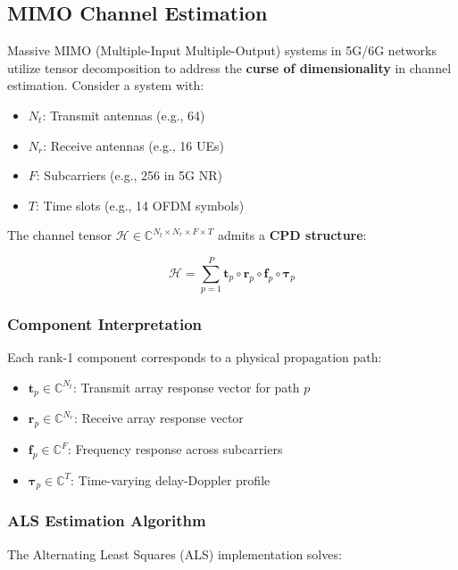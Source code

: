 \documentclass[11pt]{article}
\newcommand\0{\mathbf{0}}
\newcommand\<{\langle}
\renewcommand\>{\rangle}
\begin{document}
    \subsection{MIMO Channel Estimation}
    \label{subsec:mimo}
    
    Massive MIMO (Multiple-Input Multiple-Output) systems in 5G/6G networks utilize tensor decomposition to address the \textbf{curse of dimensionality} in channel estimation. Consider a system with:
    
    \begin{itemize}
        \item \(N_t\): Transmit antennas (e.g., 64)
        \item \(N_r\): Receive antennas (e.g., 16 UEs)
        \item \(F\): Subcarriers (e.g., 256 in 5G NR)
        \item \(T\): Time slots (e.g., 14 OFDM symbols)
    \end{itemize}
    
    The channel tensor \(\mathcal{H} \in \mathbb{C}^{N_t \times N_r \times F \times T}\) admits a \textbf{CPD structure}:
    
    \begin{equation}
        \mathcal{H} = \sum_{p=1}^P \mathbf{t}_p \circ \mathbf{r}_p \circ \mathbf{f}_p \circ \boldsymbol{\tau}_p
        \label{eq:channel_cpd}
    \end{equation}
    
    \subsubsection{Component Interpretation}
    Each rank-1 component corresponds to a physical propagation path:
    
    \begin{itemize}
        \item \(\mathbf{t}_p \in \mathbb{C}^{N_t}\): Transmit array response vector for path \(p\)
        \item \(\mathbf{r}_p \in \mathbb{C}^{N_r}\): Receive array response vector
        \item \(\mathbf{f}_p \in \mathbb{C}^{F}\): Frequency response across subcarriers
        \item \(\boldsymbol{\tau}_p \in \mathbb{C}^{T}\): Time-varying delay-Doppler profile
    \end{itemize}
    
    \subsubsection{ALS Estimation Algorithm}
    The Alternating Least Squares (ALS) implementation solves:
    
\end{document}
